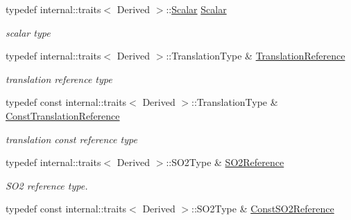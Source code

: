 \begin{DoxyCompactItemize}
\item 
typedef internal\+::traits$<$ Derived $>$\+::\hyperlink{class_sophus_1_1_s_e2_group_base_a1bad7970c24437df7f4a34281ff147fe}{Scalar} \hyperlink{class_sophus_1_1_s_e2_group_base_a1bad7970c24437df7f4a34281ff147fe}{Scalar}\hypertarget{class_sophus_1_1_s_e2_group_base_a1bad7970c24437df7f4a34281ff147fe}{}\label{class_sophus_1_1_s_e2_group_base_a1bad7970c24437df7f4a34281ff147fe}

\begin{DoxyCompactList}\small\item\em scalar type \end{DoxyCompactList}\item 
typedef internal\+::traits$<$ Derived $>$\+::Translation\+Type \& \hyperlink{class_sophus_1_1_s_e2_group_base_a971b396ee82cd53a8518bd7d6f216102}{Translation\+Reference}\hypertarget{class_sophus_1_1_s_e2_group_base_a971b396ee82cd53a8518bd7d6f216102}{}\label{class_sophus_1_1_s_e2_group_base_a971b396ee82cd53a8518bd7d6f216102}

\begin{DoxyCompactList}\small\item\em translation reference type \end{DoxyCompactList}\item 
typedef const internal\+::traits$<$ Derived $>$\+::Translation\+Type \& \hyperlink{class_sophus_1_1_s_e2_group_base_a5fbd917de2097049af437e580f3163a3}{Const\+Translation\+Reference}\hypertarget{class_sophus_1_1_s_e2_group_base_a5fbd917de2097049af437e580f3163a3}{}\label{class_sophus_1_1_s_e2_group_base_a5fbd917de2097049af437e580f3163a3}

\begin{DoxyCompactList}\small\item\em translation const reference type \end{DoxyCompactList}\item 
typedef internal\+::traits$<$ Derived $>$\+::S\+O2\+Type \& \hyperlink{class_sophus_1_1_s_e2_group_base_a057dc5e957e17fa3357cf1d2ae800c77}{S\+O2\+Reference}\hypertarget{class_sophus_1_1_s_e2_group_base_a057dc5e957e17fa3357cf1d2ae800c77}{}\label{class_sophus_1_1_s_e2_group_base_a057dc5e957e17fa3357cf1d2ae800c77}

\begin{DoxyCompactList}\small\item\em S\+O2 reference type. \end{DoxyCompactList}\item 
typedef const internal\+::traits$<$ Derived $>$\+::S\+O2\+Type \& \hyperlink{class_sophus_1_1_s_e2_group_base_a261f36c0d0c957dc49ca5f586c32e3a2}{Const\+S\+O2\+Reference}\hypertarget{class_sophus_1_1_s_e2_group_base_a261f36c0d0c957dc49ca5f586c32e3a2}{}\label{class_sophus_1_1_s_e2_group_base_a261f36c0d0c957dc49ca5f586c32e3a2}


\end{DoxyCompactItemize}
